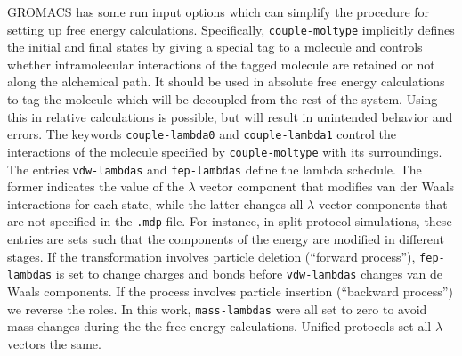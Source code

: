 \documentclass[journal=jctcce,manuscript=article]{achemso}
\newcommand{\inpopt}[1]{\texttt{#1}}
\begin{document}
GROMACS has some run input options which can simplify the procedure
for setting up free energy calculations.  Specifically, \inpopt{couple-moltype}
implicitly defines the initial and final states by giving a special tag to a
molecule and controls whether intramolecular interactions of the tagged
molecule are retained or not along the alchemical path.  It should be used in
absolute free energy calculations to tag the molecule which will be decoupled
from the rest of the system.
Using this in relative calculations is possible, but will result in unintended
behavior and errors. The keywords \inpopt{couple-lambda0} and
\inpopt{couple-lambda1} control the interactions of the molecule specified by
\inpopt{couple-moltype} with its surroundings.
The entries \inpopt{vdw-lambdas} and \inpopt{fep-lambdas}
define the lambda schedule.  The former indicates the value of the $\lambda$
vector component that modifies van der Waals interactions for each state,
while the latter changes all $\lambda$ vector components that are not specified
in the \inpopt{.mdp} file.  For instance, in split protocol simulations, these
entries are sets such that the components of the energy are modified in
different stages.  If the transformation involves particle deletion (``forward
process''), \inpopt{fep-lambdas} is set to change charges and bonds
before \inpopt{vdw-lambdas} changes van de Waals components.
If the process involves particle insertion (``backward process'') we reverse
the roles.  In this work, \inpopt{mass-lambdas} were all set to zero  to avoid
mass changes during the the free energy calculations.  Unified protocols set all $\lambda$ vectors the same.
\end{document}
